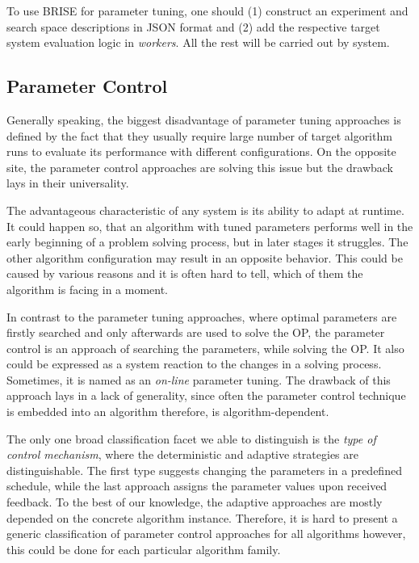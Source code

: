 To use BRISE for parameter tuning, one should (1) construct an experiment and search space descriptions in JSON format and (2) add the respective target system evaluation logic in \emph{workers}. All the rest will be carried out by system.


\subsection{Parameter Control}\label{bg: parameter control}
Generally speaking, the biggest disadvantage of parameter tuning approaches is defined by the fact that they usually require large number of target algorithm runs to evaluate its performance with different configurations. On the opposite site, the parameter control approaches are solving this issue but the drawback lays in their universality.

The advantageous characteristic of any system is its ability to adapt at runtime.
It could happen so, that an algorithm with tuned parameters performs well in the early beginning of a problem solving process, but in later stages it struggles. The other algorithm configuration may result in an opposite behavior. This could be caused by various reasons and it is often hard to tell, which of them the algorithm is facing in a moment. 

In contrast to the parameter tuning approaches, where optimal parameters are firstly searched and only afterwards are used to solve the OP, the parameter control is an approach of searching the parameters, while solving the OP. It also could be expressed as a system reaction to the changes in a solving process. Sometimes, it is named as an \emph{on-line} parameter tuning. The drawback of this approach lays in a lack of generality, since often the parameter control technique is embedded into an algorithm therefore, is algorithm-dependent.

The only one broad classification facet we able to distinguish is the \emph{type of control mechanism}, where the deterministic and adaptive strategies are distinguishable. The first type suggests changing the parameters in a predefined schedule, while the last approach assigns the parameter values upon received feedback. To the best of our knowledge, the adaptive approaches are mostly depended on the concrete algorithm instance. Therefore, it is hard to present a generic classification of parameter control approaches for all algorithms however, this could be done for each particular algorithm family.

